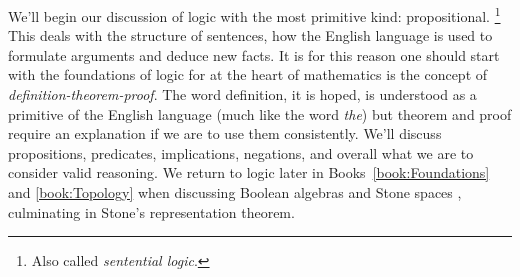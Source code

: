 We'll begin our discussion of logic with the most primitive kind:
propositional.%
\footnote{%
    Also called \textit{sentential logic}.%
}
This deals with the structure of sentences, how the English language is used to
formulate arguments and deduce new facts. It is for this reason one should start
with the foundations of logic for at the heart of mathematics is the concept of
\textit{definition-theorem-proof}. The word definition, it is hoped, is
understood as a primitive of the English language (much like the word
\textit{the}) but theorem and proof require an explanation if we are to use them
consistently. We'll discuss propositions, predicates, implications, negations,
and overall what we are to consider valid reasoning. We return to logic later
in Books~\ref{book:Foundations} and \ref{book:Topology} when discussing
Boolean algebras and Stone spaces%
, culminating in Stone's
representation theorem.
